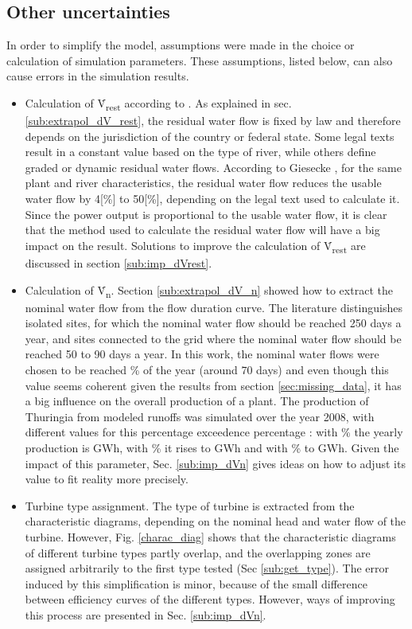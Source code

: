 \subsection{Other uncertainties}
\label{sub:limits_others}

In order to simplify the model, assumptions were made in the choice or calculation of simulation parameters. These assumptions, listed below, can also cause errors in the simulation results. 
\begin{itemize}
 \item Calculation of \.V\textsubscript{rest} according to \cite{pacer}. As explained in sec. \ref{sub:extrapol_dV_rest}, the residual water flow is fixed by law and therefore depends on the jurisdiction of the country or federal state. Some legal texts result in a constant value based on the type of river, while others define graded or dynamic residual water flows. According to Giesecke \cite{gies_qrest}, for the same plant and river characteristics, the residual water flow reduces the usable water flow by \unit{4}[\%] to \unit{50}[\%], depending on the legal text used to calculate it. Since the power output is proportional to the usable water flow, it is clear that the method used to calculate the residual water flow will have a big impact on the result. Solutions to improve the calculation of \.V\textsubscript{rest} are discussed in section \ref{sub:imp_dVrest}.
 \item Calculation of \.V\textsubscript{n}. Section \ref{sub:extrapol_dV_n} showed how to extract the nominal water flow from the flow duration curve. The literature distinguishes isolated sites, for which the nominal water flow should be reached 250 days a year, and sites connected to the grid where the nominal water flow should be reached 50 to 90 days a year. In this work, the nominal water flows were chosen to be reached \unit[20]{\%} of the year (around 70 days) and even though this value seems coherent given the results from section \ref{sec:missing_data}, it has a big influence on the overall production of a plant. The production of Thuringia from modeled runoffs was simulated over the year 2008, with different values for this percentage exceedence percentage :  with \unit[20]{\%} the yearly production is \unit[187]{GWh}, with \unit[30]{\%} it rises to \unit[210]{GWh} and with \unit[40]{\%} to \unit[223]{GWh}. Given the impact of this parameter, Sec. \ref{sub:imp_dVn} gives ideas on how to adjust its value to fit reality more precisely.
 \item Turbine type assignment. The type of turbine is extracted from the characteristic diagrams, depending on the nominal head and water flow of the turbine. However, Fig. \ref{charac_diag} shows that the characteristic diagrams of different turbine types partly overlap, and the overlapping zones are assigned arbitrarily to the first type tested (Sec \ref{sub:get_type}). The error induced by this simplification is minor, because of the small difference between efficiency curves of the different types. However, ways of improving this process are presented in Sec. \ref{sub:imp_dVn}.

\end{itemize}
